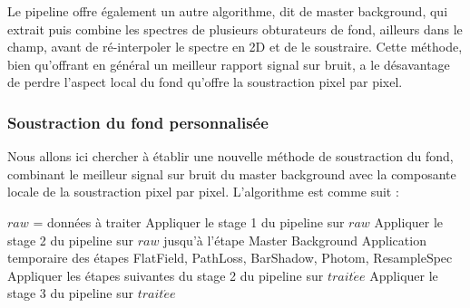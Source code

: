 \documentclass[12pt, a4paper]{article}
\begin{document}
  Le pipeline offre également un autre algorithme, dit de master background, qui extrait puis combine les spectres de plusieurs obturateurs de fond, ailleurs dans le champ, avant de ré-interpoler le spectre en 2D et de le soustraire. Cette méthode, bien qu'offrant en général un meilleur rapport signal sur bruit, a le désavantage de perdre l'aspect local du fond qu'offre la soustraction pixel par pixel.

  \subsubsection{Soustraction du fond personnalisée}

  Nous allons ici chercher à établir une nouvelle méthode de soustraction du fond, combinant le meilleur signal sur bruit du master background avec la composante locale de la soustraction pixel par pixel. L'algorithme est comme suit :\\

  \begin{algorithm}[H]
    $raw$ = données à traiter \;
    Appliquer le stage 1 du pipeline sur $raw$ \;
    Appliquer le stage 2 du pipeline sur $raw$ jusqu'à l'étape Master Background \;
    Application temporaire des étapes FlatField, PathLoss, BarShadow, Photom, ResampleSpec \;
    Appliquer les étapes suivantes du stage 2 du pipeline sur $trait\acute{e}e$\;
    Appliquer le stage 3 du pipeline sur $trait\acute{e}e$\;
  \end{algorithm}
\end{document}
